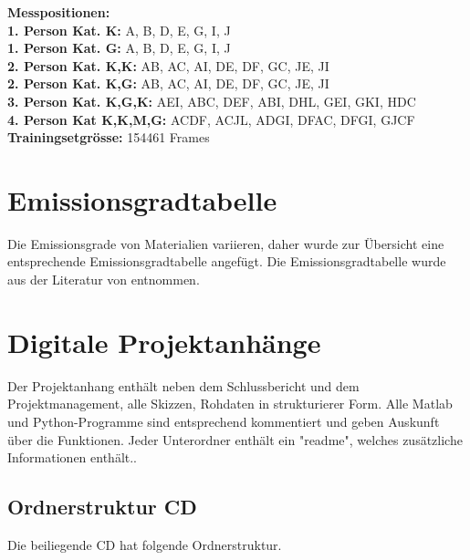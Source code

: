  \textbf{Messpositionen:}\\
\textbf{1. Person Kat. K:} A, B, D, E, G, I, J\\
\textbf{1. Person Kat. G:} A, B, D, E, G, I, J\\
\textbf{2. Person Kat. K,K:} AB, AC, AI, DE, DF, GC, JE, JI   \\
\textbf{2. Person Kat. K,G:} AB, AC, AI, DE, DF, GC, JE, JI   \\
\textbf{3. Person Kat. K,G,K:} AEI, ABC, DEF, ABI, DHL, GEI, GKI, HDC \\
\textbf{4. Person Kat K,K,M,G:} ACDF, ACJL, ADGI, DFAC, DFGI, GJCF \\
\textbf{Trainingsetgrösse:}         154461 Frames \\			
			
		\chapter{Emissionsgradtabelle}
			\label{AnhangE}
			
			Die Emissionsgrade von Materialien variieren, daher wurde zur Übersicht eine entsprechende Emissionsgradtabelle angefügt. Die Emissionsgradtabelle wurde aus der Literatur von \cite{Thermoformeln} entnommen.
			
			
			
			
			
			\chapter*{Digitale Projektanhänge}
			\label{AnhangDig}
			
			Der Projektanhang enthält neben dem Schlussbericht und dem Projektmanagement, alle Skizzen, Rohdaten in strukturierer Form. Alle Matlab und Python-Programme sind entsprechend kommentiert und geben Auskunft über die Funktionen. Jeder Unterordner enthält ein "readme", welches zusätzliche Informationen enthält..
			
			\section{Ordnerstruktur CD}
			
			
			Die beiliegende CD hat folgende Ordnerstruktur.
			
